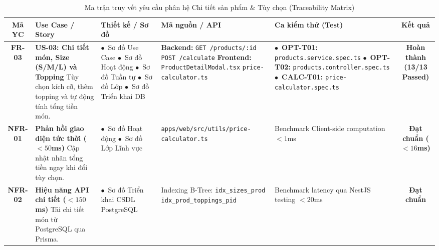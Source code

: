 \documentclass[a4paper]{article}
\begin{document}
\begin{table}[H]
\centering
\small
\begin{tabularx}{\textwidth}{|c|p{3.0cm}|p{3.0cm}|p{2.8cm}|X|c|}
\hline
\textbf{Mã YC} & \textbf{Use Case / Story} & \textbf{Thiết kế / Sơ đồ} & \textbf{Mã nguồn / API} & \textbf{Ca kiểm thử (Test)} & \textbf{Kết quả} \\ \hline
\textbf{FR-03} & 
\textbf{US-03: Chi tiết món, Size (S/M/L) và Topping} \newline 
Tùy chọn kích cỡ, thêm topping và tự động tính tổng tiền món. & 
$\bullet$~Sơ đồ Use Case \newline 
$\bullet$~Sơ đồ Hoạt động \newline 
$\bullet$~Sơ đồ Tuần tự \newline 
$\bullet$~Sơ đồ Lớp \newline 
$\bullet$~Sơ đồ Triển khai DB & 
\textbf{Backend:} \newline 
\texttt{GET /products/:id} \newline 
\texttt{POST /calculate} \newline 
\textbf{Frontend:} \newline 
\texttt{ProductDetailModal.tsx} \newline 
\texttt{price-calculator.ts} & 
$\bullet$~\textbf{OPT-T01:} \texttt{products.service.spec.ts} \newline 
$\bullet$~\textbf{OPT-T02:} \texttt{products.controller.spec.ts} \newline 
$\bullet$~\textbf{CALC-T01:} \texttt{price-calculator.spec.ts} & 
\textbf{Hoàn thành (13/13 Passed)} \\ \hline
\textbf{NFR-01} & 
\textbf{Phản hồi giao diện tức thời ($<50$ms)} \newline 
Cập nhật nhãn tổng tiền ngay khi đổi tùy chọn. & 
$\bullet$~Sơ đồ Hoạt động \newline 
$\bullet$~Sơ đồ Lớp Lĩnh vực & 
\texttt{apps/web/src/utils/price-calculator.ts} & 
Benchmark Client-side computation $< 1$ms & 
\textbf{Đạt chuẩn ($<16$ms)} \\ \hline
\textbf{NFR-02} & 
\textbf{Hiệu năng API chi tiết ($<150$ms)} \newline 
Tải chi tiết món từ PostgreSQL qua Prisma. & 
$\bullet$~Sơ đồ Triển khai CSDL PostgreSQL & 
Indexing B-Tree: \newline 
\texttt{idx\_sizes\_prod} \newline 
\texttt{idx\_prod\_toppings\_pid} & 
Benchmark latency qua NestJS testing $< 20$ms & 
\textbf{Đạt chuẩn} \\ \hline
\end{tabularx}
\caption{Ma trận truy vết yêu cầu phân hệ Chi tiết sản phẩm & Tùy chọn (Traceability Matrix)}
\label{tab:traceability_member2}
\end{table}
\end{document}

